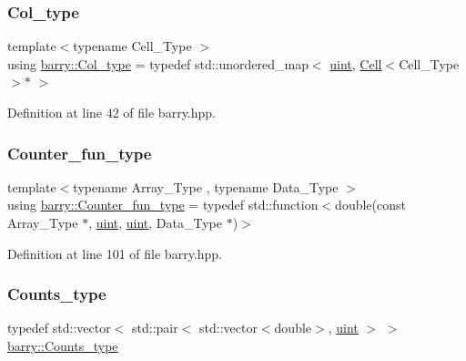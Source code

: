 \subsubsection{\texorpdfstring{Col\+\_\+type}{Col\_type}}
{\footnotesize\ttfamily template$<$typename Cell\+\_\+\+Type $>$ \\
using \hyperlink{namespacebarry_adc551002e63e38057d304f78d7756308}{barry\+::\+Col\+\_\+type} = typedef std\+::unordered\+\_\+map$<$ \hyperlink{namespacebarry_a11dfc53ddb4672278319aa04f1e09a6c}{uint}, \hyperlink{classbarry_1_1_cell}{Cell}$<$Cell\+\_\+\+Type$>$$\ast$ $>$}



Definition at line 42 of file barry.\+hpp.

\mbox{\label{namespacebarry_abaaae3200da8e4b7faac3c04fe9c3081}} 
\subsubsection{\texorpdfstring{Counter\+\_\+fun\+\_\+type}{Counter\_fun\_type}}
{\footnotesize\ttfamily template$<$typename Array\+\_\+\+Type , typename Data\+\_\+\+Type $>$ \\
using \hyperlink{namespacebarry_abaaae3200da8e4b7faac3c04fe9c3081}{barry\+::\+Counter\+\_\+fun\+\_\+type} = typedef std\+::function$<$double(const Array\+\_\+\+Type $\ast$, \hyperlink{namespacebarry_a11dfc53ddb4672278319aa04f1e09a6c}{uint}, \hyperlink{namespacebarry_a11dfc53ddb4672278319aa04f1e09a6c}{uint}, Data\+\_\+\+Type $\ast$)$>$}



Definition at line 101 of file barry.\+hpp.

\mbox{\label{namespacebarry_a3e2d8c3b6cf602107559d4237d9f1315}} 
\subsubsection{\texorpdfstring{Counts\+\_\+type}{Counts\_type}}
{\footnotesize\ttfamily typedef std\+::vector$<$ std\+::pair$<$ std\+::vector$<$double$>$, \hyperlink{namespacebarry_a11dfc53ddb4672278319aa04f1e09a6c}{uint} $>$ $>$ \hyperlink{namespacebarry_a3e2d8c3b6cf602107559d4237d9f1315}{barry\+::\+Counts\+\_\+type}}



